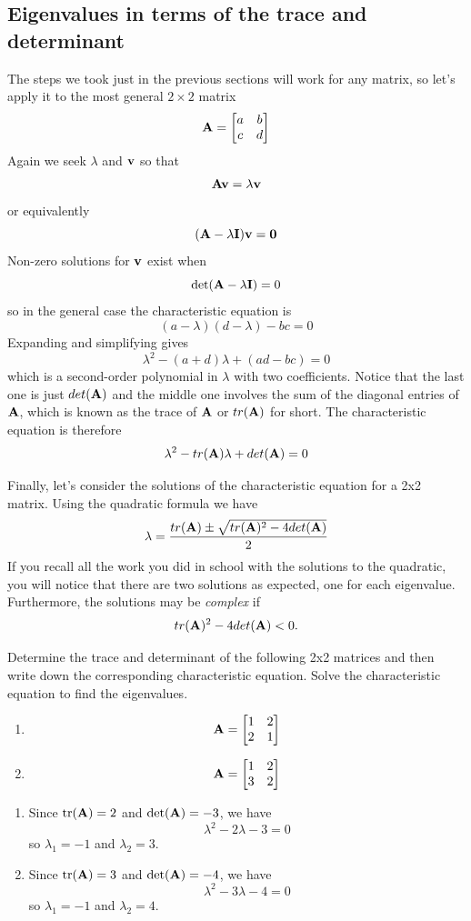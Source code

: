 \subsection{Eigenvalues in terms of the trace and determinant}

The steps we took just in the previous sections will work for any matrix, so let's apply it to the most general $2\times2$ matrix
\[ \mathbf{A} = \begin{bmatrix} a & b \\ c & d\end{bmatrix} \]
Again we seek $\lambda$ and $\mathbf{v}$ so that
\[ \mathbf{A} \mathbf{v} = \lambda \mathbf{v} \]
or equivalently
\[ (\mathbf{A} - \lambda \mathbf{I})\mathbf{v} = \mathbf{0} \]
Non-zero solutions for $\mathbf{v}$ exist when
\[ \det(\mathbf{A} - \lambda \mathbf{I}) = 0 \]
so in the general case the characteristic equation is
\[ (a-\lambda)(d-\lambda) - bc = 0 \]
Expanding and simplifying gives
\[\lambda^2 - (a+d) \lambda + (ad - bc) = 0 \]
which is a second-order polynomial in $\lambda$ with two coefficients. Notice that the last one is just $det(\mathbf{A})$ and the middle one involves the sum of the diagonal entries of $\mathbf{A}$, which is known as the trace of $\mathbf{A}$ or $tr(\mathbf{A})$ for short. The characteristic equation is therefore
\[ \lambda^2 - tr(\mathbf{A}) \lambda + det(\mathbf{A}) = 0 \]

Finally, let's consider the solutions of the characteristic equation for a 2x2 matrix. Using the quadratic formula we have
\[ \lambda = \frac{tr(\mathbf{A}) \pm \sqrt{tr(\mathbf{A})^2 - 4 det(\mathbf{A})}}{2} \]
If you recall all the work you did in school with the solutions to the quadratic, you will notice that there are two solutions as expected, one for each eigenvalue. Furthermore, the solutions may be \textit{complex} if
\[ tr(\mathbf{A})^2 - 4 det(\mathbf{A}) < 0. \]

\begin{prob}
Determine the trace and determinant of the following 2x2 matrices and then write down the corresponding characteristic equation. Solve the characteristic equation to find the eigenvalues.
\begin{enumerate}
\item \[ \mathbf{A} = \begin{bmatrix} 1 & 2 \\ 2 & 1\end{bmatrix} \]
\item \[ \mathbf{A} = \begin{bmatrix} 1 & 2 \\ 3 & 2\end{bmatrix} \]
\end{enumerate}
\end{prob}
\begin{sol}
\begin{enumerate}
    \item Since $\text{tr}(\mathbf{A})=2$ and $\det(\mathbf{A})=-3$, we have
    \[\lambda^2 - 2 \lambda - 3 = 0 \]
    so $\lambda_1=-1$ and $\lambda_2=3$.
    \item Since $\text{tr}(\mathbf{A})=3$ and $\det(\mathbf{A})=-4$, we have
    \[\lambda^2 - 3 \lambda - 4 = 0 \]
    so $\lambda_1=-1$ and $\lambda_2=4$.
\end{enumerate}
\end{sol}

